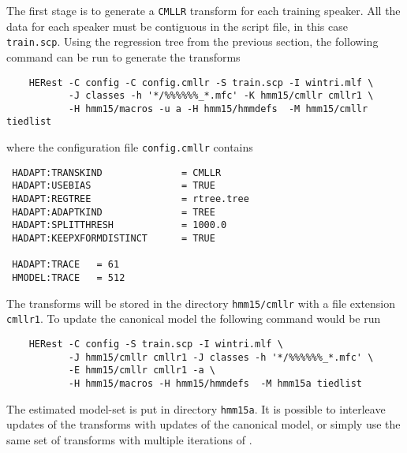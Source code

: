 The first stage is to generate a {\tt CMLLR} transform for each training
speaker. All the data for each speaker must be contiguous in the script file,
in this case \texttt{train.scp}. Using the regression tree from the previous
section, the following command can be run to generate the transforms
\begin{verbatim}
    HERest -C config -C config.cmllr -S train.scp -I wintri.mlf \
           -J classes -h '*/%%%%%%_*.mfc' -K hmm15/cmllr cmllr1 \
           -H hmm15/macros -u a -H hmm15/hmmdefs  -M hmm15/cmllr tiedlist
\end{verbatim}
where the configuration file \texttt{config.cmllr} contains
\begin{verbatim}
 HADAPT:TRANSKIND              = CMLLR
 HADAPT:USEBIAS                = TRUE
 HADAPT:REGTREE                = rtree.tree
 HADAPT:ADAPTKIND              = TREE
 HADAPT:SPLITTHRESH            = 1000.0
 HADAPT:KEEPXFORMDISTINCT      = TRUE

 HADAPT:TRACE   = 61
 HMODEL:TRACE   = 512
\end{verbatim}
The transforms will be stored in the directory \texttt{hmm15/cmllr} with a file
extension \texttt{cmllr1}. 
To update the canonical model the following command would be run
\begin{verbatim}
    HERest -C config -S train.scp -I wintri.mlf \
           -J hmm15/cmllr cmllr1 -J classes -h '*/%%%%%%_*.mfc' \
           -E hmm15/cmllr cmllr1 -a \
           -H hmm15/macros -H hmm15/hmmdefs  -M hmm15a tiedlist
\end{verbatim}
The estimated model-set is put in directory \texttt{hmm15a}. It is 
possible to interleave updates of the transforms with updates of the
canonical model, or simply use the same set of transforms with multiple
iterations of \htool{HERest}.
 
